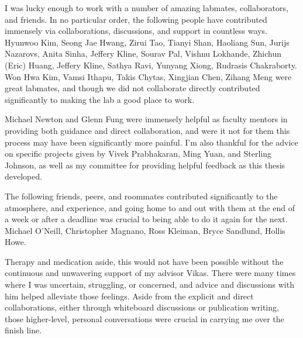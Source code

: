 \begin{acks}
I was lucky enough to work with a number of amazing labmates, collaborators, and friends. In no particular order, the following people have contributed immensely via collaborations, discussions, and support in countless ways.
Hyunwoo Kim, Seong Jae Hwang, Zirui Tao, Tianyi Shan, Haoliang Sun, Jurijs Nazarovs, Anita Sinha, Jeffery Kline, Sourav Pal, Vishnu Lokhande, Zhichun (Eric) Huang, Jeffery Kline, Sathya Ravi, Yunyang Xiong, Rudrasis Chakraborty.
Won Hwa Kim, Vamsi Ithapu, Takis Chytas, Xingjian Chen, Zihang Meng were great labmates, and though we did not collaborate directly contributed significantly to making the lab a good place to work.

Michael Newton and Glenn Fung were immensely helpful as faculty mentors in providing both guidance and direct collaboration, and were it not for them this process may have been significantly more painful.
I'm also thankful for the advice on specific projects given by Vivek Prabhakaran, Ming Yuan, and Sterling Johnson, as well as my committee for providing helpful feedback as this thesis developed.

The following friends, peers, and roommates contributed significantly to the atmosphere, and experience,
and going home to and out with them at the end of a week or after a deadline was crucial to being able to do it again for the next. Michael O'Neill, Christopher Magnano, Ross Kleiman, Bryce Sandlund, Hollis Howe.

Therapy and medication aside, this would not have been possible without the continuous and unwavering support of my advisor Vikas. There were many times where I was uncertain, struggling, or concerned,
and advice and discussions with him helped alleviate those feelings. Aside from the explicit and direct collaborations, either through whiteboard discussions or publication writing, those higher-level, personal conversations were crucial in carrying me over the finish line.


\end{acks}
